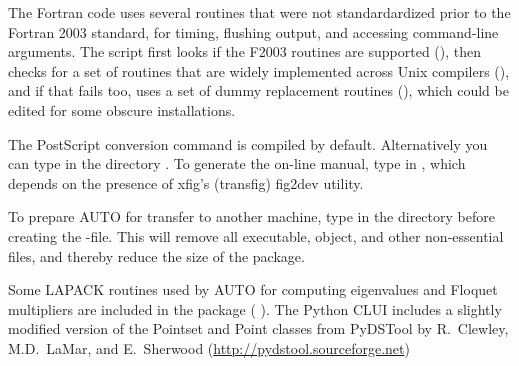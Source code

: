 \documentclass[12pt]{report}
\begin{document}
The Fortran code uses several routines that were not standardardized
prior to the Fortran 2003 standard, for timing, flushing output, and
accessing command-line arguments. The  script first looks if
the F2003 routines are supported (), then checks
for a set of routines that are widely implemented across Unix
compilers (), and if that fails too, uses a set of
dummy replacement routines (), which could be
edited for some obscure installations.

The PostScript conversion command  is compiled by
default. Alternatively you can type  in the directory
.
To generate the on-line manual, type  in
, which depends on the presence of xfig's
(transfig) fig2dev utility.

To prepare {\cal AUTO} for transfer to another machine,
type 
in the directory  before creating the -file. 
This will remove all executable, object, and other non-essential files, and
thereby reduce the size of the package.

Some {\cal LAPACK} routines used by {\cal AUTO} for computing eigenvalues and
Floquet multipliers are included in the package
( \citeyear{LAPACK:99}).
The Python CLUI includes a slightly modified version of the Pointset
and Point classes from PyDSTool by R.~Clewley, M.D.~LaMar, and E.~Sherwood
(\url{http://pydstool.sourceforge.net})
\end{document}
